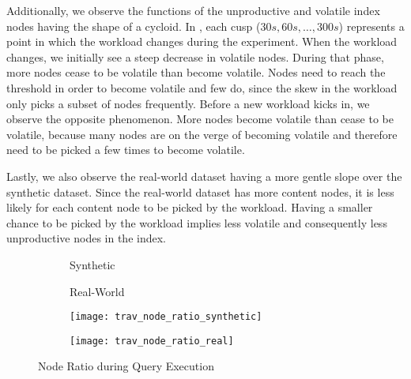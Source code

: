 \documentclass[abstracton,12pt]{scrartcl}
\theoremstyle{definition}
\begin{document}

Additionally, we observe the functions of the unproductive and volatile index
nodes having the shape of a cycloid. In , each
cusp ($30 s, 60 s, \dots, 300 s$) represents a point in which the workload
changes during the experiment. When the workload changes, we initially see a
steep decrease in volatile nodes. During that phase, more nodes cease to be
volatile than become volatile. Nodes need to reach the threshold in order to
become volatile and few do, since the skew in the workload only picks a subset of
nodes frequently. Before a new workload kicks in, we observe the opposite
phenomenon. More nodes become volatile than cease to be volatile, because many nodes are
on the verge of becoming volatile and therefore need to be picked a few times to
become volatile. 

Lastly, we also observe the real-world dataset having a more gentle slope over
the synthetic dataset. Since
the real-world dataset has more content nodes, it is less likely for each
content node to be picked by the workload. Having a smaller chance to be
picked by the workload implies less volatile and consequently less
unproductive nodes in the index.  

\begin{figure}[h]
  \centering
  \begin{subfigure}{0.49\linewidth}
    \centering
    Synthetic
  \end{subfigure}
  \begin{subfigure}{0.49\linewidth}
    \centering
    Real-World
  \end{subfigure}
  \begin{subfigure}{0.49\linewidth}
    \centering
    \texttt{[image: trav\_node\_ratio\_synthetic]}
    \caption{}
    \label{fig:trav_node_ratio_synthetic}
  \end{subfigure}
  \begin{subfigure}{0.49\linewidth}
    \centering
    \texttt{[image: trav\_node\_ratio\_real]}
    \caption{}
    \label{fig:trav_node_ratio_real}
  \end{subfigure}
  \caption{Node Ratio during Query Execution}
  \label{fig:trav_node_ratio}
\end{figure}
\end{document}
